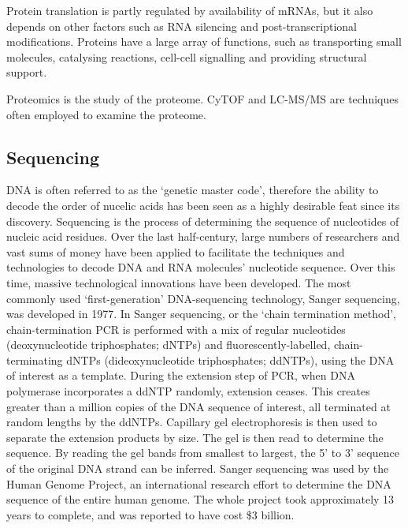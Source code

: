 Protein translation is partly regulated by availability of mRNAs, but it also depends on other factors such as RNA silencing and post-transcriptional modifications.
Proteins have a large array of functions, such as transporting small molecules, catalysing reactions, cell-cell signalling and providing structural support.

Proteomics is the study of the proteome.
CyTOF and LC-MS/MS are techniques often employed to examine the proteome. %

\subsection{Sequencing}
DNA is often referred to as the `genetic master code', therefore the ability to decode the order of nucelic acids has been seen as a highly desirable feat since its discovery.
Sequencing is the process of determining the sequence of nucleotides of nucleic acid residues.
Over the last half-century, large numbers of researchers and vast sums of money have been applied to facilitate the techniques and technologies to decode DNA and RNA molecules' nucleotide sequence\cite{heather2016sequence}.
Over this time, massive technological innovations have been developed.
The most commonly used `first-generation' DNA-sequencing technology, Sanger sequencing, was developed in 1977\cite{sanger1977dna}.
In Sanger sequencing, or the `chain termination method', chain-termination PCR is performed with a mix of regular nucleotides (deoxynucleotide triphosphates; dNTPs) and fluorescently-labelled, chain-terminating dNTPs (dideoxynucleotide triphosphates; ddNTPs), using the DNA of interest as a template.
During the extension step of PCR, when DNA polymerase incorporates a ddNTP randomly, extension ceases.
This creates greater than a million copies of the DNA sequence of interest, all terminated at random lengths by the ddNTPs.
Capillary gel electrophoresis is then used to separate the extension products by size.
The gel is then read to determine the sequence.
By reading the gel bands from smallest to largest, the 5' to 3' sequence of the original DNA strand can be inferred.
Sanger sequencing was used by the Human Genome Project, an international research effort to determine the DNA sequence of the entire human genome\cite{pennisi2001human}.
The whole project took approximately 13 years to complete, and was reported to have cost \$3 billion.

